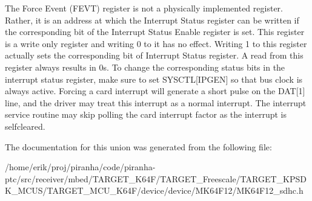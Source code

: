The Force Event (F\+E\+VT) register is not a physically implemented register. Rather, it is an address at which the Interrupt Status register can be written if the corresponding bit of the Interrupt Status Enable register is set. This register is a write only register and writing 0 to it has no effect. Writing 1 to this register actually sets the corresponding bit of Interrupt Status register. A read from this register always results in 0\textquotesingle{}s. To change the corresponding status bits in the interrupt status register, make sure to set S\+Y\+S\+C\+TL\mbox{[}I\+P\+G\+EN\mbox{]} so that bus clock is always active. Forcing a card interrupt will generate a short pulse on the D\+AT\mbox{[}1\mbox{]} line, and the driver may treat this interrupt as a normal interrupt. The interrupt service routine may skip polling the card interrupt factor as the interrupt is selfcleared. 

The documentation for this union was generated from the following file\+:\begin{DoxyCompactItemize}
\item 
/home/erik/proj/piranha/code/piranha-\/ptc/src/receiver/mbed/\+T\+A\+R\+G\+E\+T\+\_\+\+K64\+F/\+T\+A\+R\+G\+E\+T\+\_\+\+Freescale/\+T\+A\+R\+G\+E\+T\+\_\+\+K\+P\+S\+D\+K\+\_\+\+M\+C\+U\+S/\+T\+A\+R\+G\+E\+T\+\_\+\+M\+C\+U\+\_\+\+K64\+F/device/device/\+M\+K64\+F12/M\+K64\+F12\+\_\+sdhc.\+h\end{DoxyCompactItemize}
